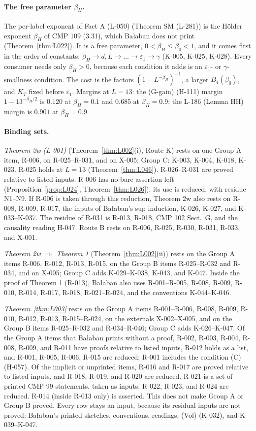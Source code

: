 \paragraph{The free parameter $\beta_H$.} The per-label exponent of Fact A (L-050) (Theorem SM (L-281)) is the H\"older exponent $\beta_H$ of CMP 109 (3.31), which Ba{\l}aban does not print (Theorem~\ref{thm:L022}). It is a free parameter, $0<\beta_H\le\beta_0<1$, and it comes first in the order of constants: $\beta_H\to d,L\to\dots\to\varepsilon_1\to\gamma$ (K-005, K-025, K-028). Every consumer needs only $\beta_H>0$, because each condition it adds is an $\varepsilon_1$- or $\gamma$-smallness condition. The cost is the factors $(1-L^{-\beta_H})^{-1}$, a larger $B_4(\beta_0)$, and $K_T$ fixed before $\varepsilon_1$. Margins at $L=13$: the (G-gain) (H-111) margin $1-13^{-\beta_H/2}$ is $0.120$ at $\beta_H=0.1$ and $0.685$ at $\beta_H=0.9$; the L-186 (Lemma HH) margin is $0.901$ at $\beta_H=0.9$.

\paragraph{Binding sets.} \emph{Theorem 2w (L-001)} (Theorem~\ref{thm:L002}(i), Route K) rests on one Group A item, R-006, on R-025--R-031, and on X-005; Group C: K-003, K-004, K-018, K-023. R-025 holds at $L=13$ (Theorem~\ref{thm:L046}). R-026--R-031 are proved relative to listed inputs. R-006 has no bare assertion left (Proposition~\ref{prop:L024}, Theorem~\ref{thm:L026}); its use is reduced, with residue N1--N9. If R-006 is taken through this reduction, Theorem 2w also rests on R-008, R-009, R-017, the inputs of Ba{\l}aban's sup induction, K-026, K-027, and K-033--K-037. The residue of R-031 is R-013, R-018, CMP 102 Sect.~G, and the causality reading H-047. Route B rests on R-006, R-025, R-030, R-031, R-033, and X-001.

\emph{Theorem 2w $\Rightarrow$ Theorem 1} (Theorem~\ref{thm:L002}(ii)) rests on the Group A items R-006, R-012, R-013, R-015, on the Group B items R-025--R-032 and R-034, and on X-005; Group C adds K-029--K-038, K-043, and K-047. Inside the proof of Theorem 1 (R-013), Ba{\l}aban also uses R-001--R-005, R-008, R-009, R-010, R-014, R-017, R-018, R-021--R-024, and the conventions K-044--K-046.

\emph{Theorem~\ref{thm:L003}} rests on the Group A items R-001--R-006, R-008, R-009, R-010, R-012, R-013, R-015--R-024, on the externals X-002--X-005, and on the Group B items R-025--R-032 and R-034--R-046; Group C adds K-026--K-047. Of the Group A items that Ba{\l}aban prints without a proof, R-002, R-003, R-004, R-008, R-009, and R-011 have proofs relative to listed inputs, R-012 holds as a list, and R-001, R-005, R-006, R-015 are reduced; R-001 includes the condition (C) (H-057). Of the implicit or unprinted items, R-016 and R-017 are proved relative to listed inputs, and R-018, R-019, and R-020 are reduced. R-021 is a set of printed CMP 99 statements, taken as inputs. R-022, R-023, and R-024 are reduced. R-014 (inside R-013 only) is asserted. This does not make Group A or Group B proved. Every row stays an input, because its residual inputs are not proved: Ba{\l}aban's printed sketches, conventions, readings, (Vol) (K-032), and K-039--K-047.

